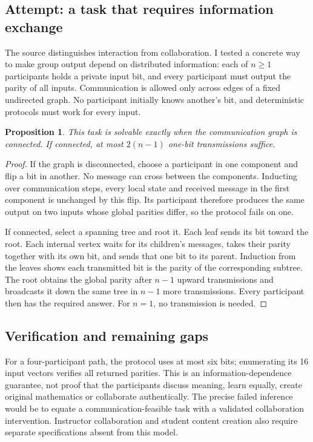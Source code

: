 \documentclass[11pt]{article}
\newtheorem{proposition}{Proposition}
\begin{document}
\subsection{Attempt: a task that requires information exchange}
The source distinguishes interaction from collaboration. I tested a concrete way to make group output depend on distributed information: each of $n\ge1$ participants holds a private input bit, and every participant must output the parity of all inputs. Communication is allowed only across edges of a fixed undirected graph. No participant initially knows another's bit, and deterministic protocols must work for every input.
\begin{proposition}
This task is solvable exactly when the communication graph is connected. If connected, at most $2(n-1)$ one-bit transmissions suffice.
\end{proposition}
\begin{proof}
If the graph is disconnected, choose a participant in one component and flip a bit in another. No message can cross between the components. Inducting over communication steps, every local state and received message in the first component is unchanged by this flip. Its participant therefore produces the same output on two inputs whose global parities differ, so the protocol fails on one.

If connected, select a spanning tree and root it. Each leaf sends its bit toward the root. Each internal vertex waits for its children's messages, takes their parity together with its own bit, and sends that one bit to its parent. Induction from the leaves shows each transmitted bit is the parity of the corresponding subtree. The root obtains the global parity after $n-1$ upward transmissions and broadcasts it down the same tree in $n-1$ more transmissions. Every participant then has the required answer. For $n=1$, no transmission is needed.
\end{proof}
\subsection{Verification and remaining gaps}
For a four-participant path, the protocol uses at most six bits; enumerating its 16 input vectors verifies all returned parities. This is an information-dependence guarantee, not proof that the participants discuss meaning, learn equally, create original mathematics or collaborate authentically. The precise failed inference would be to equate a communication-feasible task with a validated collaboration intervention. Instructor collaboration and student content creation also require separate specifications absent from this model.
\end{document}
